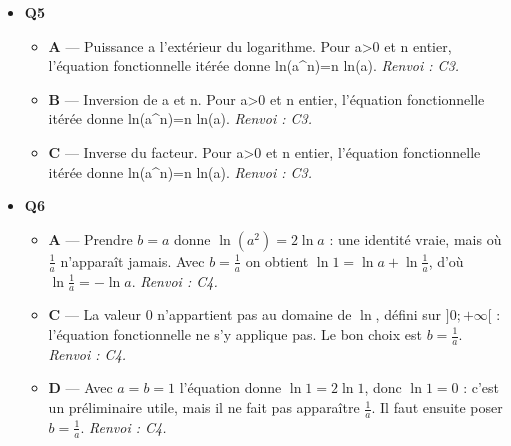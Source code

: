 \begin{itemize}
\begin{itemize}
    \item \textbf{B} — Valeur erronee. Lorsque x tend vers 0 par valeurs positives, ln(x) décroît sans borne et tend vers -infini. \emph{Renvoi : C1.}
    \item \textbf{D} — Erreur de signe de l'infini. Lorsque x tend vers 0 par valeurs positives, ln(x) décroît sans borne et tend vers -infini. \emph{Renvoi : C1.}
  \end{itemize}
  \item \textbf{Q5}
  \begin{itemize}
    \item \textbf{A} — Puissance a l'extérieur du logarithme. Pour a>0 et n entier, l'équation fonctionnelle itérée donne ln(a\textasciicircum{}n)=n ln(a). \emph{Renvoi : C3.}
    \item \textbf{B} — Inversion de a et n. Pour a>0 et n entier, l'équation fonctionnelle itérée donne ln(a\textasciicircum{}n)=n ln(a). \emph{Renvoi : C3.}
    \item \textbf{C} — Inverse du facteur. Pour a>0 et n entier, l'équation fonctionnelle itérée donne ln(a\textasciicircum{}n)=n ln(a). \emph{Renvoi : C3.}
  \end{itemize}
  \item \textbf{Q6}
  \begin{itemize}
    \item \textbf{A} — Prendre $b=a$ donne $\ln(a^2)=2\ln a$ : une identité vraie, mais où $\tfrac1a$ n'apparaît jamais. Avec $b=\tfrac1a$ on obtient $\ln 1=\ln a+\ln\tfrac1a$, d'où $\ln\tfrac1a=-\ln a$. \emph{Renvoi : C4.}
    \item \textbf{C} — La valeur $0$ n'appartient pas au domaine de $\ln$, défini sur $]0;+\infty[$ : l'équation fonctionnelle ne s'y applique pas. Le bon choix est $b=\tfrac1a$. \emph{Renvoi : C4.}
    \item \textbf{D} — Avec $a=b=1$ l'équation donne $\ln 1=2\ln 1$, donc $\ln 1=0$ : c'est un préliminaire utile, mais il ne fait pas apparaître $\tfrac1a$. Il faut ensuite poser $b=\tfrac1a$. \emph{Renvoi : C4.}
  \end{itemize}
\end{itemize}
\fi

